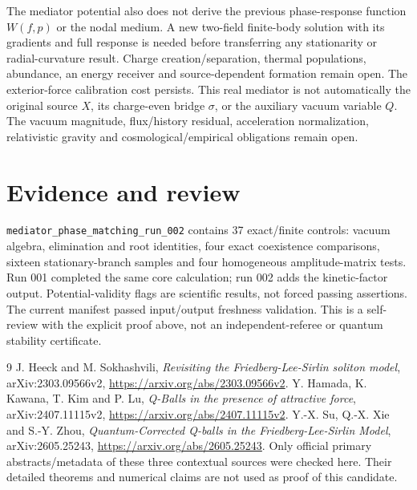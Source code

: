 \documentclass[11pt]{article}
\begin{document}
The mediator potential also does not derive the previous phase-response
function $W(f,p)$ or the nodal medium. A new two-field finite-body solution
with its gradients and full response is needed before transferring any
stationarity or radial-curvature result. Charge creation/separation,
thermal populations, abundance, an energy receiver and source-dependent
formation remain open. The exterior-force calibration cost persists.
This real mediator is not automatically the original source $X$, its
charge-even bridge $\sigma$, or the auxiliary vacuum variable $Q$.
The vacuum magnitude, flux/history residual, acceleration normalization,
relativistic gravity and cosmological/empirical obligations remain open.

\section{Evidence and review}
\texttt{mediator\_phase\_matching\_run\_002} contains 37 exact/finite
controls: vacuum algebra, elimination and root identities, four exact
coexistence comparisons, sixteen stationary-branch samples and four
homogeneous amplitude-matrix tests. Run 001 completed the same core
calculation; run 002 adds the kinetic-factor output. Potential-validity
flags are scientific results, not forced passing assertions. The current
manifest passed input/output freshness validation. This is a self-review
with the explicit proof above, not an independent-referee or quantum
stability certificate.

\begin{thebibliography}{9}
 J. Heeck and M. Sokhashvili,
\emph{Revisiting the Friedberg-Lee-Sirlin soliton model},
arXiv:2303.09566v2, \url{https://arxiv.org/abs/2303.09566v2}.
 Y. Hamada, K. Kawana, T. Kim and P. Lu,
\emph{Q-Balls in the presence of attractive force},
arXiv:2407.11115v2, \url{https://arxiv.org/abs/2407.11115v2}.
 Y.-X. Su, Q.-X. Xie and S.-Y. Zhou,
\emph{Quantum-Corrected Q-balls in the Friedberg-Lee-Sirlin Model},
arXiv:2605.25243, \url{https://arxiv.org/abs/2605.25243}.
Only official primary abstracts/metadata of these three contextual sources
were checked here. Their detailed theorems and numerical claims are not
used as proof of this candidate.
\end{thebibliography}
\end{document}

